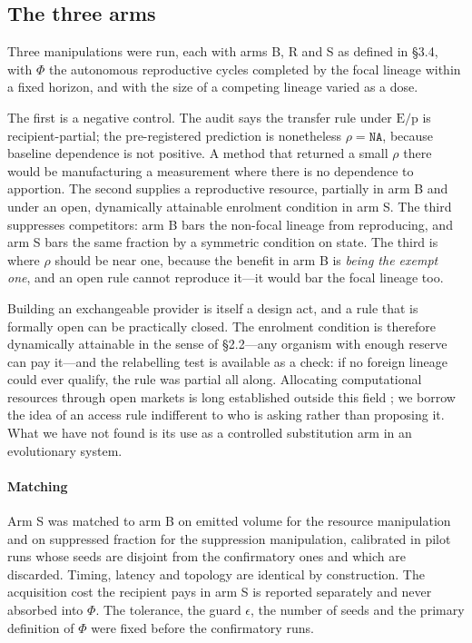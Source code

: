 \subsection{The three arms}

Three manipulations were run, each with arms B, R and S as defined in \S3.4,
with $\Phi$ the autonomous reproductive cycles completed by the focal lineage
within a fixed horizon, and with the size of a competing lineage varied as a
dose.

The first is a negative control. The audit says the transfer rule under
$\mathrm{E/p}$ is recipient-partial; the pre-registered prediction is
nonetheless $\rho=\texttt{NA}$, because baseline dependence is not positive. A
method that returned a small $\rho$ there would be manufacturing a measurement
where there is no dependence to apportion. The second supplies a reproductive
resource, partially in arm B and under an open, dynamically attainable
enrolment condition in arm S. The third suppresses competitors: arm B bars the
non-focal lineage from reproducing, and arm S bars the same fraction by a
symmetric condition on state. The third is where $\rho$ should be near one,
because the benefit in arm B is \emph{being the exempt one}, and an open rule
cannot reproduce it---it would bar the focal lineage too.

Building an exchangeable provider is itself a design act, and a rule that is
formally open can be practically closed. The enrolment condition is therefore
dynamically attainable in the sense of \S2.2---any organism with enough reserve
can pay it---and the relabelling test is available as a check: if no foreign
lineage could ever qualify, the rule was partial all along. Allocating
computational resources through open markets is long established outside this
field \citep{sutherland1968,miller1988,waldspurger1992}; we borrow the idea of
an access rule indifferent to who is asking rather than proposing it. What we
have not found is its use as a controlled substitution arm in an evolutionary
system.

\paragraph{Matching}
Arm S was matched to arm B on emitted volume for the resource manipulation and
on suppressed fraction for the suppression manipulation, calibrated in pilot
runs whose seeds are disjoint from the confirmatory ones and which are
discarded. Timing, latency and topology are identical by construction. The
acquisition cost the recipient pays in arm S is reported separately and never
absorbed into $\Phi$. The tolerance, the guard $\epsilon$, the number of seeds
and the primary definition of $\Phi$ were fixed before the confirmatory runs.

